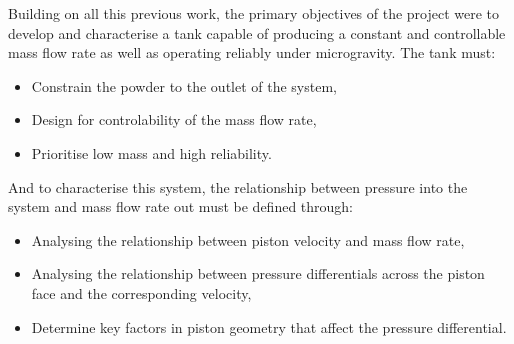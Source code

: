 Building on all this previous work, the primary objectives of the project were to develop and characterise a tank capable of producing a constant and controllable mass flow rate as well as operating reliably under microgravity. The tank must:
\begin{itemize}
    \item Constrain the powder to the outlet of the system,
    \item Design for controlability of the mass flow rate,
    \item Prioritise low mass and high reliability.
\end{itemize}
And to characterise this system, the relationship between pressure into the system and mass flow rate out must be defined through:
\begin{itemize}
    \item Analysing the relationship between piston velocity and mass flow rate,
    \item Analysing the relationship between pressure differentials across the piston face and the corresponding velocity,
    \item Determine key factors in piston geometry that affect the pressure differential.
\end{itemize}